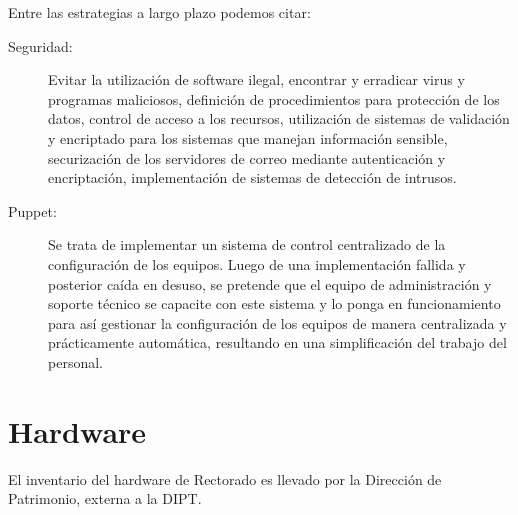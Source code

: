\documentclass[a4paper,11pt,oneside]{article}
\begin{document}
Entre las estrategias a largo plazo podemos citar:
%
\begin{description}
\item[Seguridad:]
  Evitar la utilización de software ilegal, encontrar y
  erradicar virus y programas maliciosos, definición de procedimientos
  para protección de los datos, control de acceso a los recursos,
  utilización de sistemas de validación y encriptado para los
  sistemas que manejan información sensible, securización de los
  servidores de correo mediante autenticación y encriptación,
  implementación de sistemas de detección de intrusos.
%
\item[Puppet:]
  Se trata de implementar un sistema de control centralizado de la
  configuración de los equipos. Luego de una implementación fallida y
  posterior caída en desuso, se pretende que el equipo de
  administración y soporte técnico se capacite con este sistema y lo
  ponga en funcionamiento para así gestionar la configuración de los
  equipos de manera centralizada y prácticamente automática,
  resultando en una simplificación del trabajo del personal.
\end{description}
%
\newpage\section{Hardware}
%
El inventario del hardware de Rectorado es llevado por la
Dirección de Patrimonio, externa a la DIPT.
\end{document}
